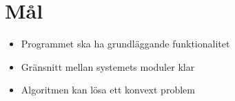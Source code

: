 \section{Mål}
\begin{itemize}
\item Programmet ska ha grundläggande funktionalitet
\item Gränsnitt mellan systemets moduler klar
\item Algoritmen kan lösa ett konvext problem
\end{itemize} 